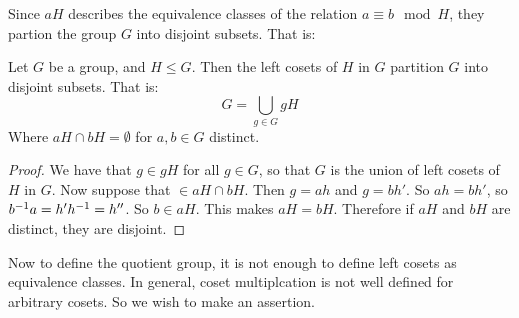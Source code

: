 Since $aH$ describes the equivalence classes of the relation  $a \equiv b
\mod{H}$, they partion the group $G$ into disjoint subsets. That is:

\begin{theorem}\label{theorem_3.2.2}
  Let $G$ be a group, and  $H \leq G$. Then the left cosets of $H$ in $G$
  partition $G$ into disjoint subsets. That is:
  \begin{equation}
    G = \bigcup_{g \in G}{gH}
  \end{equation}
  Where $aH \cap bH=\emptyset$ for  $a,b \in G$ distinct.
\end{theorem}
\begin{proof}
  We have that $g \in gH$ for all $g \in G$, so that  $G$ is the union of left
  cosets of  $H$ in  $G$. Now suppose that $ \in aH \cap bH$. Then  $g=ah$ and
  $g=bh'$. So $ah=bh'$, so  $b^{-1}a = h'h^{-1}=h''$. So $b \in aH$. This
  makes $aH=bH$. Therefore if $aH$ and $bH$ are distinct, they are disjoint.
\end{proof}

Now to define the quotient group, it is not enough to define left cosets as
equivalence classes. In general, coset multiplcation is not well defined for
arbitrary cosets. So we wish to make an assertion.

